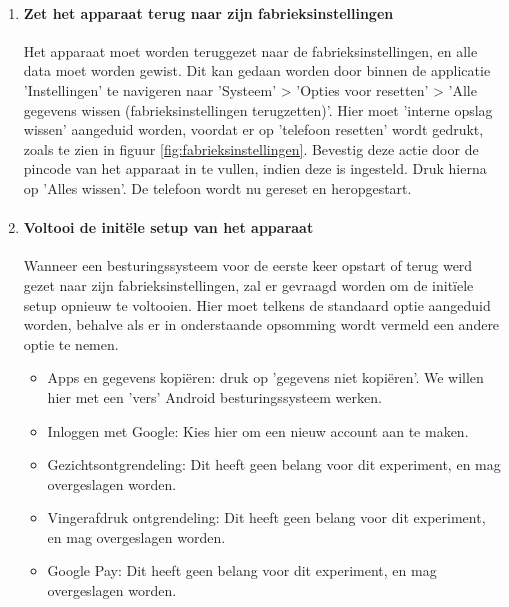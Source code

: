 \begin{enumerate}
    
    \item
    \paragraph{Zet het apparaat terug naar zijn fabrieksinstellingen}
    \label{itm:factoryreset}
    
    Het apparaat moet worden teruggezet naar de fabrieksinstellingen, en alle data moet worden gewist. Dit kan gedaan worden door binnen de applicatie 'Instellingen' te navigeren naar 'Systeem' > 'Opties voor resetten' > 'Alle gegevens wissen (fabrieksinstellingen terugzetten)'. Hier moet 'interne opslag wissen' aangeduid worden, voordat er op 'telefoon resetten' wordt gedrukt, zoals te zien in figuur \ref{fig:fabrieksinstellingen}. Bevestig deze actie door de pincode van het apparaat in te vullen, indien deze is ingesteld. Druk hierna op 'Alles wissen'. De telefoon wordt nu gereset en heropgestart.
    
    \item
    \paragraph{Voltooi de initële setup van het apparaat}
    \label{itm:initialsetup}
    
    Wanneer een besturingssysteem voor de eerste keer opstart of terug werd gezet naar zijn fabrieksinstellingen, zal er gevraagd worden om de initïele setup opnieuw te voltooien. Hier moet telkens de standaard optie aangeduid worden, behalve als er in onderstaande opsomming wordt vermeld een andere optie te nemen.
    \begin{itemize}
        \item Apps en gegevens kopiëren: druk op 'gegevens niet kopiëren'. We willen hier met een 'vers' Android besturingssysteem werken.
        \item Inloggen met Google: Kies hier om een nieuw account aan te maken.
        \item Gezichtsontgrendeling: Dit heeft geen belang voor dit experiment, en mag overgeslagen worden.
        \item Vingerafdruk ontgrendeling: Dit heeft geen belang voor dit experiment, en mag overgeslagen worden.
        \item Google Pay: Dit heeft geen belang voor dit experiment, en mag overgeslagen worden.
    \end{itemize}


\end{enumerate}
